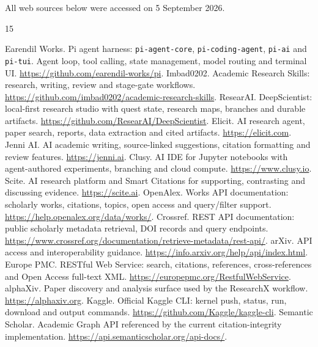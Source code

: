 \documentclass[12pt,a4paper]{report}
\numberwithin{equation}{chapter}
\begin{document}
All web sources below were accessed on 5 September 2026.

\begin{thebibliography}{15}
\small
\raggedright
{} Earendil Works. Pi agent harness: \texttt{pi-agent-core}, \texttt{pi-coding-agent}, \texttt{pi-ai} and \texttt{pi-tui}. Agent loop, tool calling, state management, model routing and terminal UI. \url{https://github.com/earendil-works/pi}.
 Imbad0202. Academic Research Skills: research, writing, review and stage-gate workflows. \url{https://github.com/imbad0202/academic-research-skills}.
 ResearAI. DeepScientist: local-first research studio with quest state, research maps, branches and durable artifacts. \url{https://github.com/ResearAI/DeepScientist}.
 Elicit. AI research agent, paper search, reports, data extraction and cited artifacts. \url{https://elicit.com}.
 Jenni AI. AI academic writing, source-linked suggestions, citation formatting and review features. \url{https://jenni.ai}.
 Clusy. AI IDE for Jupyter notebooks with agent-authored experiments, branching and cloud compute. \url{https://www.clusy.io}.
 Scite. AI research platform and Smart Citations for supporting, contrasting and discussing evidence. \url{https://scite.ai}.
 OpenAlex. Works API documentation: scholarly works, citations, topics, open access and query/filter support. \url{https://help.openalex.org/data/works/}.
 Crossref. REST API documentation: public scholarly metadata retrieval, DOI records and query endpoints. \url{https://www.crossref.org/documentation/retrieve-metadata/rest-api/}.
 arXiv. API access and interoperability guidance. \url{https://info.arxiv.org/help/api/index.html}.
 Europe PMC. RESTful Web Service: search, citations, references, cross-references and Open Access full-text XML. \url{https://europepmc.org/RestfulWebService}.
 alphaXiv. Paper discovery and analysis surface used by the ResearchX workflow. \url{https://alphaxiv.org}.
 Kaggle. Official Kaggle CLI: kernel push, status, run, download and output commands. \url{https://github.com/Kaggle/kaggle-cli}.
 Semantic Scholar. Academic Graph API referenced by the current citation-integrity implementation. \url{https://api.semanticscholar.org/api-docs/}.
\end{thebibliography}
\end{document}
